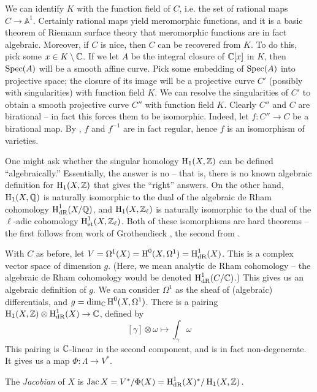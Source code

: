 \documentclass{article}
\begin{document}
\begin{remark}
We can identify $K$ with the function field of $C$, i.e. the set of rational 
maps $C\to\mathbb{A}^1$. Certainly rational maps yield meromorphic functions, 
and it is a basic theorem of Riemann surface theory that meromorphic functions 
are in fact algebraic. Moreover, if $C$ is nice, then $C$ can be recovered 
from $K$. To do this, pick some $x\in K\setminus \mathbb{C}$. If we let $A$ be 
the integral closure of $\mathbb{C}[x]$ in $K$, then $\operatorname{Spec}(A)$ will be a 
smooth affine curve. Pick some embedding of $\operatorname{Spec}(A)$ into projective space; 
the closure of its image will be a projective curve $C'$ (possibly with 
singularities) with function field $K$. We can resolve the singularities of 
$C'$ to obtain a smooth projective curve $C''$ with function field $K$. 
Clearly $C''$ and $C$ are birational -- in fact this forces them to be 
isomorphic. Indeed, let $f:C''\to C$ be a birational map. By 
\cite[thm 3.1]{mi}, $f$ and $f^{-1}$ are in fact regular, hence $f$ is an 
isomorphism of varieties. 
\end{remark}

One might ask whether the singular homology $\operatorname{H}_1(X,\mathbb{Z})$ can be 
defined ``algebraically.'' Essentially, the answer is no -- that is, there is 
no known algebraic definition for $\operatorname{H}_1(X,\mathbb{Z})$ that gives the 
``right'' answers. On the other hand, $\operatorname{H}_1(X,\mathbb{Q})$ is naturally 
isomorphic to the dual of the algebraic de Rham cohomology 
$\operatorname{H}_\text{dR}^1(X/\mathbb{Q})$, and $\operatorname{H}_1(X,\mathbb{Z}_\ell)$ is naturally 
isomorphic to the dual of the $\ell$-adic cohomology 
$\operatorname{H}_\text{et}^1(X,\mathbb{Z}_\ell)$. Both of these isomorphisms are hard 
theorems -- the first follows from work of Grothendieck \cite{gr66}, the 
second from \cite[I 4.6.3]{de77}. 

With $C$ as before, let $V=\Omega^1(X)=\operatorname{H}^0(X,\Omega^1)=\operatorname{H}^1_\text{dR}(X)$. 
This is a complex vector space of dimension $g$. (Here, we mean analytic de 
Rham cohomology -- the algebraic de Rham cohomology would be denoted 
$\operatorname{H}_\text{dR}^1(C/\mathbb{C})$.) This gives us an algebraic definition of $g$. 
We can consider $\Omega^1$ as the sheaf of (algebraic) differentials, and 
$g=\dim_{\mathbb{C}}\operatorname{H}^0(X,\Omega^1)$. There is a pairing 
$\operatorname{H}_1(X,\mathbb{Z})\otimes\operatorname{H}_\text{dR}^1(X)\to\mathbb{C}$, defined by 
\[
  [\gamma]\otimes \omega \mapsto \int_\gamma \omega
\]
This pairing is $\mathbb{C}$-linear in the second component, and is in fact 
non-degenerate. It gives us a map $\Phi:\Lambda\to V^*$. 

\begin{definition}[analytic]
The \emph{Jacobian} of $X$ is 
$\operatorname{Jac} X=V^*/\Phi(X) = \operatorname{H}_\textnormal{dR}^1(X)^*/\operatorname{H}_1(X,\mathbb{Z})$. 
\end{definition}
\end{document}
